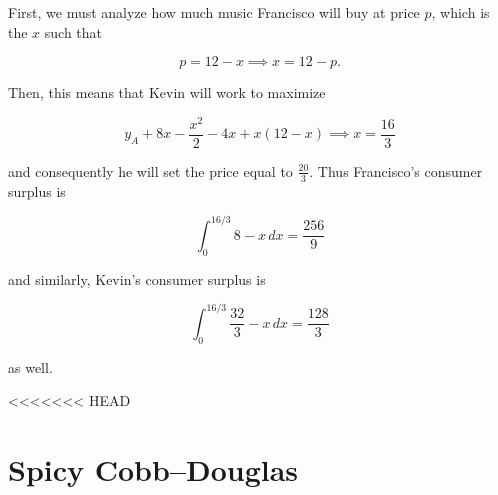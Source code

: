 \documentclass[11pt]{article}
\begin{document}
\begin{enumerate}
\begin{sol}
First, we must analyze how much music Francisco will buy at price $p$, which is
the $x$ such that

$$p = 12 - x \implies x = 12 - p.$$

Then, this means that Kevin will work to maximize

$$y_A + 8x - \dfrac{x^2}{2} - 4x + x(12 - x) \implies x = \dfrac{16}{3}$$

and consequently he will set the price equal to $\frac{20}{3}$. Thus Francisco's
consumer surplus is

$$\int_0^{16/3} 8 - x\, dx = \dfrac{256}{9}$$

and similarly, Kevin's consumer surplus is

$$\int_0^{16/3} \dfrac{32}{3} - x \, dx = \dfrac{128}{3}$$

as well.

\end{sol}


\end{enumerate}
<<<<<<< HEAD
\section{Spicy Cobb--Douglas}
\end{document}
